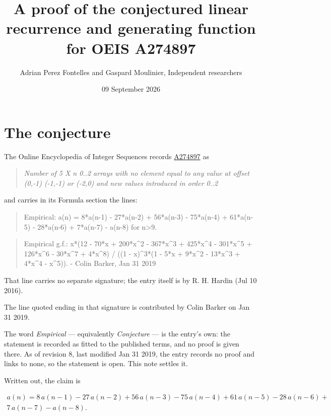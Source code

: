 \documentclass[11pt]{article}
\title{A proof of the conjectured linear recurrence and generating function for OEIS A274897}
\author{Adrian Perez Fontelles and Gaspard Moulinier, Independent researchers}
\date{09 September 2026}
\theoremstyle{definition}
\begin{document}
\maketitle
\section{The conjecture}

The Online Encyclopedia of Integer Sequences records \href{https://oeis.org/A274897}{A274897} as

\begin{quote}\itshape Number of 5 X n 0..2 arrays with no element equal to any value at offset (0,-1) (-1,-1) or (-2,0) and new values introduced in order 0..2\end{quote}

and carries in its Formula section the lines:

\begin{quote}\ttfamily Empirical: a(n) = 8*a(n-1) - 27*a(n-2) + 56*a(n-3) - 75*a(n-4) + 61*a(n-5) - 28*a(n-6) + 7*a(n-7) - a(n-8) for n>9.\end{quote}

\begin{quote}\ttfamily Empirical g.f.: x*(12 - 70*x + 200*x\textasciicircum{}2 - 367*x\textasciicircum{}3 + 425*x\textasciicircum{}4 - 301*x\textasciicircum{}5 + 126*x\textasciicircum{}6 - 30*x\textasciicircum{}7 + 4*x\textasciicircum{}8) / ((1 - x)\textasciicircum{}3*(1 - 5*x + 9*x\textasciicircum{}2 - 13*x\textasciicircum{}3 + 4*x\textasciicircum{}4 - x\textasciicircum{}5)). - Colin Barker, Jan 31 2019\end{quote}

That line carries no separate signature; the entry itself is by R. H. Hardin (Jul 10 2016).

The line quoted ending in that signature is contributed by Colin Barker on Jan 31 2019.

The word {\itshape Empirical} --- equivalently {\itshape Conjecture} --- is the entry's own: the statement is recorded as fitted to the published terms, and no proof is given there. As of revision 8, last modified Jan 31 2019, the entry records no proof and links to none, so the statement is open. This note settles it.

Written out, the claim is

\begin{multline*} a(n) = 8\,a(n-1) - 27\,a(n-2) + 56\,a(n-3) - 75\,a(n-4) + 61\,a(n-5) - 28\,a(n-6) + \\ 7\,a(n-7) - a(n-8). \end{multline*}
\end{document}

